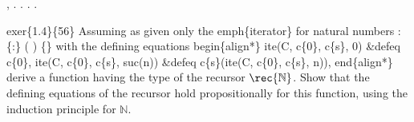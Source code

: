 \begin{coqdoccode}
\coqdocnoindent
{} \coqdockw{\ensuremath{\forall}}    ,    \coqdocnotation{(}\coqdocnotation{;} \coqdocnotation{)} \coqdocnotation{=}   . . .\coqdoceol
\coqdocemptyline
\coqdocnoindent
{} .\coqdoceol
\coqdocemptyline
\end{coqdoccode}
exer\{1.4\}\{56\}  Assuming as given only the emph\{iterator\} for natural numbers
   : 
  \{:\}   (  )  \{\}  
with the defining equations
begin\{align*\}
  ite(C, c\{0\}, c\{s\}, 0) \&defeq c\{0\}, 
  ite(C, c\{0\}, c\{s\}, suc(n)) \&defeq c\{s\}(ite(C, c\{0\}, c\{s\}, n)),
end\{align*\}
derive a function having the type of the recursor $\rec{\mathbb{N}}$.  Show
that the defining equations of the recursor hold propositionally for this
function, using the induction principle for $\mathbb{N}$.


